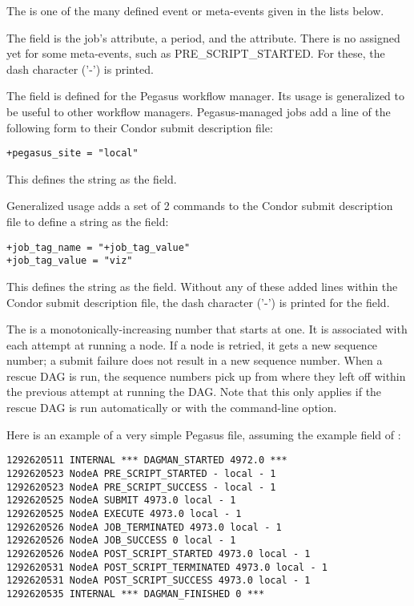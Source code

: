 \begin{description}
The  is one of the many defined event or meta-events given
in the lists below.

The  field is the job's 
 attribute, a period, and the  attribute. 
There is no  assigned yet for some meta-events,
such as PRE\_SCRIPT\_STARTED.
For these, the dash character ('-') is printed. 

The  field is defined for the Pegasus workflow manager.
Its usage is generalized to be useful to other workflow managers.
Pegasus-managed jobs add a line of the following form to their
Condor submit description file:
\begin{verbatim}
+pegasus_site = "local"
\end{verbatim}
This defines the string  as the  field.
 
Generalized usage adds a set of 2 commands to the Condor
submit description file to define a string as the  field:
\begin{verbatim}
+job_tag_name = "+job_tag_value"
+job_tag_value = "viz"
\end{verbatim}
This defines the string  as the  field.
Without any of these added lines within the Condor submit description file,
the dash character ('-') is printed for the  field. 

The  is a monotonically-increasing number 
that starts at one.
It is associated with each attempt at running a node.
If a node is retried, it gets a new sequence number;
a submit failure does not result in a new sequence number.
When a rescue DAG is run,
the sequence numbers pick up from where they left off within the previous
attempt at running the DAG.
Note that this only applies if the rescue
DAG is run automatically or with the  command-line option.

\end{description}

Here is an example of a very simple Pegasus  file,
assuming the example  field of :

\begin{verbatim}
1292620511 INTERNAL *** DAGMAN_STARTED 4972.0 ***
1292620523 NodeA PRE_SCRIPT_STARTED - local - 1
1292620523 NodeA PRE_SCRIPT_SUCCESS - local - 1
1292620525 NodeA SUBMIT 4973.0 local - 1
1292620525 NodeA EXECUTE 4973.0 local - 1
1292620526 NodeA JOB_TERMINATED 4973.0 local - 1
1292620526 NodeA JOB_SUCCESS 0 local - 1
1292620526 NodeA POST_SCRIPT_STARTED 4973.0 local - 1
1292620531 NodeA POST_SCRIPT_TERMINATED 4973.0 local - 1
1292620531 NodeA POST_SCRIPT_SUCCESS 4973.0 local - 1
1292620535 INTERNAL *** DAGMAN_FINISHED 0 ***
\end{verbatim}



